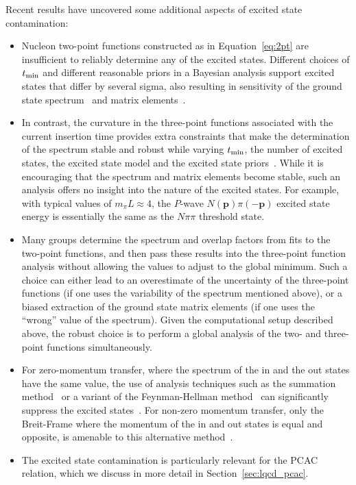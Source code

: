 \documentclass{ar-1col}
\def\tmin{t_{\rm min}}
\begin{document}
Recent results have uncovered some additional aspects of excited state contamination:
\begin{itemize}[leftmargin=*]
\item Nucleon two-point functions constructed as in Equation~\eqref{eq:2pt} are insufficient to reliably determine any of the excited states.  Different choices of $\tmin$ and different reasonable priors in a Bayesian analysis support excited states that differ by several sigma, also resulting in sensitivity of the ground state spectrum~\cite{Park:2021ypf,He:2021yvm} and matrix elements~\cite{Jang:2019vkm,Gupta:2021ahb}.

\item In contrast, the curvature in the three-point functions associated with the current insertion time provides extra constraints that make the determination of the spectrum stable and robust while varying $\tmin$, the number of excited states, the excited state model and the excited state priors~\cite{He:2021yvm}.
While it is encouraging that the spectrum and matrix elements become stable, such an analysis offers no insight into the nature of the excited states.  For example, with typical values of $m_\pi L\approx4$, the $P$-wave $N(\mathbf{p})\pi(-\mathbf{p})$ excited state energy is essentially the same as the $N\pi\pi$ threshold state.%
\begin{marginnote}
\end{marginnote}

\item Many groups determine the spectrum and overlap factors from fits to the two-point functions, and then pass these results into the three-point function analysis without allowing the values to adjust to the global minimum.  Such a choice can either lead to an overestimate of the uncertainty of the three-point functions (if one uses the variability of the spectrum mentioned above), or a biased extraction of the ground state matrix elements (if one uses the ``wrong'' value of the spectrum).  Given the computational setup described above, the robust choice is to perform a global analysis of the two- and three-point functions simultaneously.

\item For zero-momentum transfer,
 where the spectrum of the in and the out states have the same value,
 the use of analysis techniques such as the summation method~\cite{Maiani:1987by}
 or a variant of the Feynman-Hellman
 method~\cite{deDivitiis:2012vs,Bouchard:2016heu} can significantly suppress the excited states~\cite{Capitani:2012gj,He:2021yvm}.
For non-zero momentum transfer, only the Breit-Frame where the momentum of the in and out states is equal and opposite, is amenable to this alternative method~\cite{Gambhir:2019pvw}.

\item The excited state contamination is particularly relevant for the PCAC relation, which we discuss in more detail in Section~\ref{sec:lqcd_pcac}.


\end{itemize}
\end{document}
